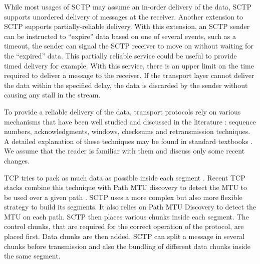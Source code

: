While most usages of SCTP may assume an in-order delivery of the
data, SCTP supports unordered delivery of messages at the receiver. 
Another extension to SCTP \cite{rfc3758} supports partially-reliable delivery. With this
extension,  an SCTP sender can be instructed to ``expire'' data based on 
one of several events,
such as a timeout,
the sender can signal the SCTP receiver to move on without waiting for 
the ``expired'' data.
This
partially reliable service could be useful to provide timed delivery
for example. With this service, there is an upper limit on the time
required to deliver a message to the receiver. If the
transport layer cannot deliver the data within the specified delay,
the data is discarded by the sender without causing any stall in the stream.

To provide a reliable delivery of the data, transport protocols rely on various mechanisms that have been well studied and discussed in the literature : sequence numbers, acknowledgments, windows, checksums and retransmission techniques. A detailed explanation of these techniques may be found in standard textbooks \cite{Bonaventure_CNP3:2012,ross2003computer,Fall_TCP:2011}. We assume that the reader is familiar with them and discuss only some recent changes. 


TCP tries to pack as much data as possible inside each segment \cite{rfc793}. Recent TCP stacks combine this technique with Path MTU discovery to detect the MTU to be used over a given path \cite{rfc4821}. SCTP uses a more complex but also more flexible strategy to build its segments. It also relies on Path MTU Discovery to detect the MTU on each path. SCTP then places various chunks inside each segment. The control chunks, that are required for the correct operation of the protocol, are placed first. Data chunks are then added. SCTP can split a message in several chunks before transmission and also the bundling of different data chunks inside the same segment.


